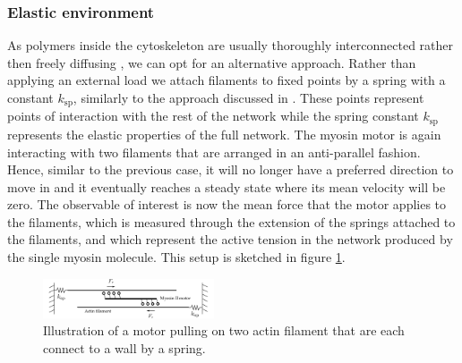 \documentclass[aps,pre,twocolumn,showpacs,showkeys,superscriptaddress,floatfix]{revtex4-1}
\begin{document}
\subsubsection{Elastic environment}
\label{sec:environment}
As polymers inside the cytoskeleton are usually thoroughly interconnected rather then freely diffusing \cite{blanchoin2014actin,ennomani2016architecture},
we can opt for an alternative approach.
Rather than applying an external load we attach filaments to fixed points by a spring with a constant $k_\text{sp}$, 
similarly to the approach discussed in \cite{Albert2014}. 
These points represent points of interaction with the rest of the network while the spring constant $k_\text{sp}$ represents the elastic properties of the full network. 
The myosin motor is again interacting with two filaments that are arranged in an anti-parallel fashion. 
Hence, similar to the previous case, it will no longer have a preferred direction to move in and 
it eventually reaches a steady state where its mean velocity will be zero. 
The observable of interest is now the mean force that the motor applies to the filaments, 
which is measured through the extension of the springs attached to the filaments,
and which represent the active tension in the network produced by the single myosin molecule. 
This setup is sketched in figure \ref{fig:tug}. 
\begin{figure}[t]
\centering
\includegraphics[width=0.45\textwidth,height=!]{tug}
\caption{
\label{fig:tug}
Illustration of a motor pulling on two actin filament that are each connect to a wall by a spring.
}
\end{figure}
\end{document}
